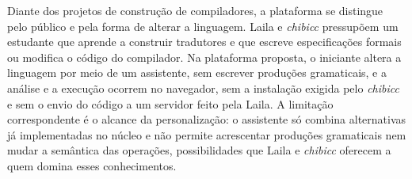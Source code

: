 Diante dos projetos de construção de compiladores, a plataforma se distingue pelo público e pela forma de alterar a linguagem. Laila e \textit{chibicc} pressupõem um estudante que aprende a construir tradutores e que escreve especificações formais ou modifica o código do compilador. Na plataforma proposta, o iniciante altera a linguagem por meio de um assistente, sem escrever produções gramaticais, e a análise e a execução ocorrem no navegador, sem a instalação exigida pelo \textit{chibicc} e sem o envio do código a um servidor feito pela Laila. A limitação correspondente é o alcance da personalização: o assistente só combina alternativas já implementadas no núcleo e não permite acrescentar produções gramaticais nem mudar a semântica das operações, possibilidades que Laila e \textit{chibicc} oferecem a quem domina esses conhecimentos.
